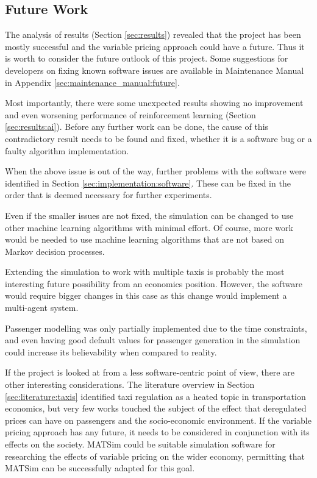 \subsection{Future Work}

The analysis of results (Section \ref{sec:results}) revealed that the project
has been mostly successful and the variable pricing approach could have a
future. Thus it is worth to consider the future outlook of this project. Some
suggestions for developers on fixing known software issues are available in
Maintenance Manual in Appendix \ref{sec:maintenance_manual:future}.

Most importantly, there were some unexpected results showing no improvement and
even worsening performance of reinforcement learning (Section
\ref{sec:results:ai}). Before any further work can be done, the cause of
this contradictory result needs to be found and fixed, whether it is a software
bug or a faulty algorithm implementation.

When the above issue is out of the way, further problems with the software were
identified in Section \ref{sec:implementation:software}. These can be fixed in
the order that is deemed necessary for further experiments. 

Even if the smaller issues are not fixed, the simulation can be changed to use
other machine learning algorithms with minimal effort. Of course, more work
would be needed to use machine learning algorithms that are not based on Markov
decision processes.

Extending the simulation to work with multiple taxis is probably the most
interesting future possibility from an economics position. However, the
software would require bigger changes in this case as this change would
implement a multi-agent system.

Passenger modelling was only partially implemented due to the time constraints,
and even having good default values for passenger generation in the simulation
could increase its believability when compared to reality.

If the project is looked at from a less software-centric point of view, there
are other interesting considerations. The literature overview in Section
\ref{sec:literature:taxis} identified taxi regulation as a heated topic in
transportation economics, but very few works touched the subject of the effect
that deregulated prices can have on passengers and the socio-economic
environment. If the variable pricing approach has any future, it needs to be
considered in conjunction with its effects on the society. MATSim could be
suitable simulation software for researching the effects of variable pricing on
the wider economy, permitting that MATSim can be successfully adapted for this
goal.
